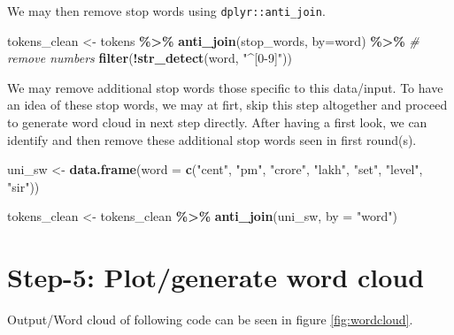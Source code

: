 \documentclass[
]{book}
\newenvironment{Shaded}{\begin{snugshade}}{\end{snugshade}}
\newcommand{\AttributeTok}[1]{\textcolor[rgb]{0.13,0.29,0.53}{#1}}
\newcommand{\CommentTok}[1]{\textcolor[rgb]{0.56,0.35,0.01}{\textit{#1}}}
\newcommand{\FunctionTok}[1]{\textcolor[rgb]{0.13,0.29,0.53}{\textbf{#1}}}
\newcommand{\NormalTok}[1]{#1}
\newcommand{\OtherTok}[1]{\textcolor[rgb]{0.56,0.35,0.01}{#1}}
\newcommand{\SpecialCharTok}[1]{\textcolor[rgb]{0.81,0.36,0.00}{\textbf{#1}}}
\newcommand{\StringTok}[1]{\textcolor[rgb]{0.31,0.60,0.02}{#1}}
\begin{document}
We may then remove stop words using \texttt{dplyr::anti\_join}.

\begin{Shaded}
\begin{Highlighting}[]
\NormalTok{tokens\_clean }\OtherTok{\textless{}{-}}\NormalTok{ tokens }\SpecialCharTok{\%\textgreater{}\%}
  \FunctionTok{anti\_join}\NormalTok{(stop\_words, }\AttributeTok{by=}\StringTok{\textquotesingle{}word\textquotesingle{}}\NormalTok{) }\SpecialCharTok{\%\textgreater{}\%} 
  \CommentTok{\# remove numbers}
  \FunctionTok{filter}\NormalTok{(}\SpecialCharTok{!}\FunctionTok{str\_detect}\NormalTok{(word, }\StringTok{"\^{}[0{-}9]"}\NormalTok{))}
\end{Highlighting}
\end{Shaded}

We may remove additional stop words those specific to this data/input. To have an idea of these stop words, we may at firt, skip this step altogether and proceed to generate word cloud in next step directly. After having a first look, we can identify and then remove these additional stop words seen in first round(s).

\begin{Shaded}
\begin{Highlighting}[]
\NormalTok{uni\_sw }\OtherTok{\textless{}{-}} \FunctionTok{data.frame}\NormalTok{(}\AttributeTok{word =} \FunctionTok{c}\NormalTok{(}\StringTok{"cent"}\NormalTok{, }\StringTok{"pm"}\NormalTok{, }\StringTok{"crore"}\NormalTok{, }
                              \StringTok{"lakh"}\NormalTok{, }\StringTok{"set"}\NormalTok{,}
                              \StringTok{"level"}\NormalTok{, }\StringTok{"sir"}\NormalTok{))}

\NormalTok{tokens\_clean }\OtherTok{\textless{}{-}}\NormalTok{ tokens\_clean }\SpecialCharTok{\%\textgreater{}\%} 
  \FunctionTok{anti\_join}\NormalTok{(uni\_sw, }\AttributeTok{by =} \StringTok{"word"}\NormalTok{)}
\end{Highlighting}
\end{Shaded}

\hypertarget{step-5-plotgenerate-word-cloud}{%
\section{Step-5: Plot/generate word cloud}\label{step-5-plotgenerate-word-cloud}}

Output/Word cloud of following code can be seen in figure \ref{fig:wordcloud}.
\end{document}
